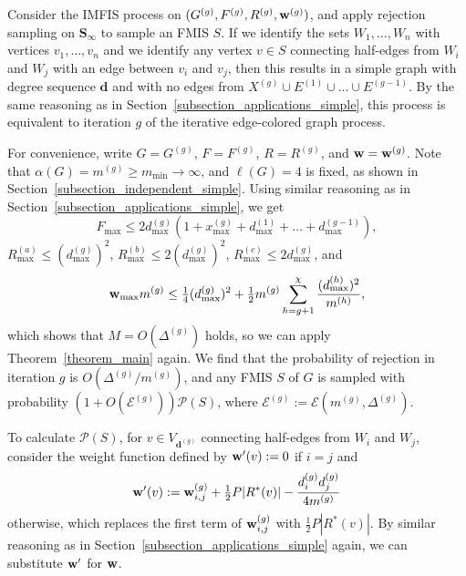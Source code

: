 \documentclass{article}
\theoremstyle{plain}
\theoremstyle{remark}
\theoremstyle{plain}
\numberwithin{equation}{section}
\renewcommand{\d}{{\boldsymbol{d}}}
\renewcommand{\b}{{\bf{w}}}
\begin{document}
	Consider the IMFIS process on $(G^{(g)},F^{(g)},R^{(g)},\b^{(g)})$, and apply rejection sampling on $\boldsymbol{S}_{\infty}$ to sample an FMIS $S$. If we identify the sets $W_1,\ldots,W_n$ with vertices $v_1,\ldots,v_n$ and we identify any vertex $v\in S$ connecting half-edges from $W_i$ and $W_j$ with an edge between $v_i$ and $v_j$, then this results in a simple graph with degree sequence $\d$ and with no edges from $X^{(g)}\cup E^{(1)}\cup\ldots\cup E^{(g-1)}$. By the same reasoning as in Section~\ref{subsection_applications_simple}, this process is equivalent to iteration $g$ of the iterative edge-colored graph process.
	
	For convenience, write $G=G^{(g)}$, $F=F^{(g)}$, $R=R^{(g)}$, and $\b=\b^{(g)}$. Note that $\alpha(G)=m^{(g)}\geq m_{\min}\to\infty$, and $\ell(G)=4$ is fixed, as shown in Section~\ref{subsection_independent_simple}. Using similar reasoning as in Section~\ref{subsection_applications_simple}, we get $$F_{\max}\leq2d_{\max}^{(g)}(1+x_{\max}^{(g)}+d_{\max}^{(1)}+\ldots+d_{\max}^{(g-1)}),$$ $R_{\max}^{(a)}\leq(d_{\max}^{(g)})^2$, $R_{\max}^{(b)}\leq2(d_{\max}^{(g)})^2$, $R_{\max}^{(c)}\leq2d_{\max}^{(g)}$, and $$\b_{\max}m^{(g)}\leq\tfrac14(d_{\max}^{(g)})^2+\tfrac12m^{(g)}\sum_{h=g+1}^{\chi}\frac{(d_{\max}^{(h)})^2}{m^{(h)}},$$ which shows that $M=O(\Delta^{(g)})$ holds, so we can apply Theorem~\ref{theorem_main} again. We find that the probability of rejection in iteration $g$ is $O(\Delta^{(g)}/m^{(g)})$, and any FMIS $S$ of $G$ is sampled with probability $(1+O(\mathscr{E}^{(g)}))\mathscr{P}(S)$, where $\mathscr{E}^{(g)}:=\mathscr{E}(m^{(g)},\Delta^{(g)})$.
	
	To calculate $\mathscr{P}(S)$, for $v\in V_{\d^{(g)}}$ connecting half-edges from $W_i$ and $W_j$, consider the weight function defined by $\b'(v):=0$ if $i=j$ and $$\b'(v):=\b_{i,j}^{(g)}+\tfrac12P|R^*(v)|-\frac{d_i^{(g)}d_j^{(g)}}{4m^{(g)}}$$ otherwise, which replaces the first term of $\b_{i,j}^{(g)}$ with $\frac12P|R^*(v)|$. By similar reasoning as in Section~\ref{subsection_applications_simple} again, we can substitute $\b'$ for $\b$.
	
\end{document}
